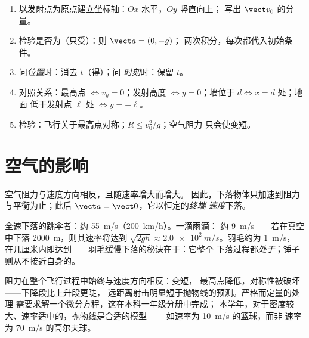 \begin{method}[抛体问题的梳理]\label{met:g12:projectile-motion:method}
\begin{enumerate}
  \item 以发射点为原点建立坐标轴：$Ox$ 水平，$Oy$ 竖直向上；
        写出 $\vect v_0$ 的分量。
  \item 检验是否为（只受）：则 $\vect a = (0,-g)$；
        两次积分，每次都代入初始条件。
  \item 问\emph{位置}时：消去 $t$（得）；问
        \emph{时刻}时：保留 $t$。
  \item 对照关系：最高点 $\Leftrightarrow v_y = 0$；发射高度
        $\Leftrightarrow y = 0$；墙位于 $d \Leftrightarrow x = d$ 处；地面
        低于发射点 $\ell$ 处 $\Leftrightarrow y = -\ell$。
  \item 检验：飞行关于最高点对称；$R \leq v_0^2/g$；空气阻力
        只会使变短。
\end{enumerate}
\end{method}

\section{空气的影响}

\begin{definition}[终端速度]\label{def:g12:projectile-motion:terminal}
空气阻力与速度方向相反，且随速率增大而增大。
因此，下落物体只加速到阻力与平衡为止；此后
$\vect a = \vect 0$，它以恒定的\emph{终端
速度}下落。
\end{definition}

\begin{example}[终端速度的数量级]\label{ex:g12:projectile-motion:airorders}
全速下落的跳伞者：约 \qty{55}{m/s}（\qty{200}{km/h}）。一滴雨滴：
约 \qty{9}{m/s}——若在真空中下落 \qty{2000}{m}，则其速率将达到
$\sqrt{2gh} \approx \qty{2.0e2}{m/s}$。羽毛约为 \qty{1}{m/s}，
在几厘米内即达到——羽毛缓慢下落的秘诀在于：它整个
下落过程都\emph{处于}；锤子则从不接近自身的。
\end{example}

\begin{remark}[真实弹道]\label{rem:g12:projectile-motion:drag}
阻力在整个飞行过程中始终与速度方向相反：变短，
最高点降低，对称性被破坏——下降段比上升段更陡，
远距离射击明显短于抛物线的预测。严格而定量的处理
需要求解一个微分方程，这在本科一年级分册中完成；
本学年，对于密度较大、速率适中的，抛物线是合适的模型——
如速率为 \qty{10}{m/s} 的篮球，而非
速率为 \qty{70}{m/s} 的高尔夫球。
\end{remark}

